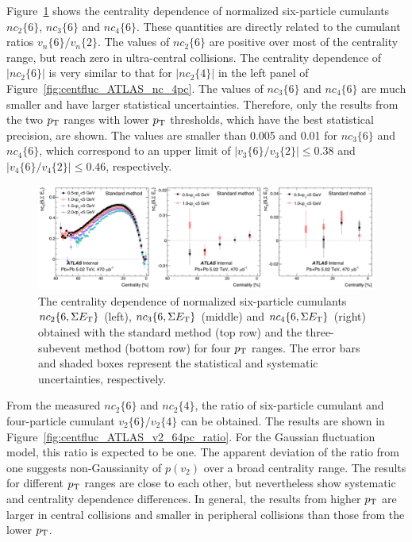 Figure~\ref{fig:centfluc_ATLAS_vn_6pc_ratio} shows the centrality dependence of normalized six-particle cumulants $nc_2\{6\}$, $nc_3\{6\}$ and $nc_4\{6\}$. These quantities are directly related to the cumulant ratios $v_n\{6\} / v_n\{2\}$. The values of $nc_2\{6\}$ are positive over most of the centrality range, but reach zero in ultra-central collisions. The centrality dependence of $|nc_2\{6\}|$ is very similar to that for $|nc_2\{4\}|$ in the left panel of Figure~\ref{fig:centfluc_ATLAS_nc_4pc}. The values of $nc_3\{6\}$ and $nc_4\{6\}$ are much smaller and have larger statistical uncertainties. Therefore, only the results from the two $p_\text{T}$ ranges with lower $p_\text{T}$ thresholds, which have the best statistical precision, are shown. The values are smaller than 0.005 and 0.01 for $nc_3\{6\}$ and $nc_4\{6\}$, which correspond to an upper limit of $|v_3\{6\} / v_3\{2\}| \le 0.38$ and $|v_4\{6\} / v_4\{2\}| \le 0.46$, respectively.

\begin{figure}[H]
\centering
\includegraphics[width=.95\linewidth]{figs/chapter_centfluc/ATLAS_vn_6pc_ratio.png}
\caption{The centrality dependence of normalized six-particle cumulants $nc_2\{6, \Sigma E_\text{T}\}$ (left), $nc_3\{6, \Sigma E_\text{T}\}$ (middle) and $nc_4\{6, \Sigma E_\text{T}\}$ (right) obtained with the standard method (top row) and the three-subevent method (bottom row) for four $p_\text{T}$ ranges. The error bars and shaded boxes represent the statistical and systematic uncertainties, respectively.}
\label{fig:centfluc_ATLAS_vn_6pc_ratio}
\end{figure}

From the measured $nc_2\{6\}$ and $nc_2\{4\}$, the ratio of six-particle cumulant and four-particle cumulant $v_2\{6\} / v_2\{4\}$ can be obtained. The results are shown in Figure~\ref{fig:centfluc_ATLAS_v2_64pc_ratio}. For the Gaussian fluctuation model, this ratio is expected to be one. The apparent deviation of the ratio from one suggests non-Gaussianity of $p(v_2)$ over a broad centrality range. The results for different $p_\text{T}$ ranges are close to each other, but nevertheless show systematic and centrality dependence differences. In general, the results from higher $p_\text{T}$ are larger in central collisions and smaller in peripheral collisions than those from the lower $p_\text{T}$.

